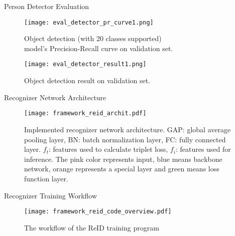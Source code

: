 \begin{frame}{Person Detector Evaluation}
    \begin{figure}
    \centering
    \texttt{[image: eval\_detector\_pr\_curve1.png]}
    \caption{Object detection (with 20 classes supported)\\ 
        model's Precision-Recall curve on validation set.}
    \texttt{[image: eval\_detector\_result1.png]}
    \caption{Object detection result on validation set.}
    \end{figure}
\end{frame}







\begin{frame}{Recognizer Network Architecture}
    \begin{figure}
        \texttt{[image: framework\_reid\_archit.pdf]}
        \caption[Implemented recognizer network architecture]
        {
            Implemented recognizer network architecture.
                    GAP: global average pooling layer, BN: batch normalization
                    layer, FC: fully connected layer.
                    $f_t$: features used to calculate triplet loss,
                    $f_i$: features used for inference.
            The pink color represents input, blue means backbone network, 
            orange represents a special layer and green means loss function 
            layer.
        }
    \end{figure}
\end{frame}


\begin{frame}{Recognizer Training Workflow}
    \begin{figure}
        \texttt{[image: framework\_reid\_code\_overview.pdf]}
        \caption{The workflow of the ReID training program}
    \end{figure}
\end{frame}

